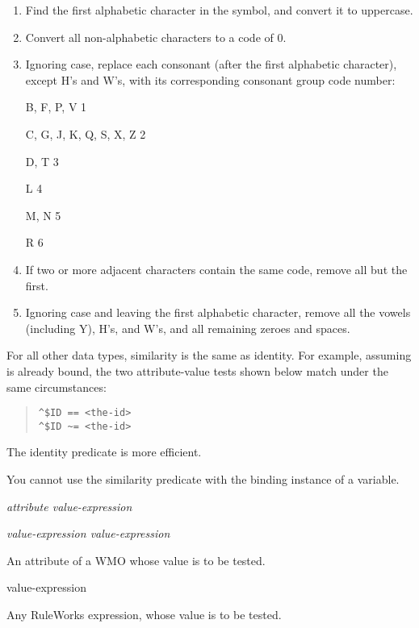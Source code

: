 \begin{enumerate}
\item Find the first alphabetic character in the symbol, and convert
  it to uppercase.
\item Convert all non-alphabetic characters to a code of 0.
\item Ignoring case, replace each consonant (after the first
  alphabetic character), except H's and W's, with its corresponding
  consonant group code number:

  B, F, P, V    1

  C, G, J, K, Q, S, X, Z  2

  D, T    3

  L     4

  M, N    5

  R     6
\item If two or more adjacent characters contain the same code, remove
  all but the first.
\item Ignoring case and leaving the first alphabetic character, remove
  all the vowels (including Y), H's, and W's, and all remaining zeroes
  and spaces.
\end{enumerate}

For all other data types, similarity is the same as identity.  For
example, assuming  is already bound, the two
attribute-value tests shown below match under the same circumstances:

\begin{quote}
\begin{verbatim}
^$ID == <the-id>
^$ID ~= <the-id>
\end{verbatim}
\end{quote}

The identity predicate is more efficient.

You cannot use the similarity predicate with the binding instance of a
variable.

\Format

\ct\it{attribute} \co{\~{}=} \it{value-expression}

\it{value-expression} \co{\~{}=} \it{value-expression}

\begin{operands}
\item[\ct{attribute}]

  An attribute of a WMO whose value is to be tested.

\item[value-expression]

  Any RuleWorks expression, whose value is to be tested.
\end{operands}

